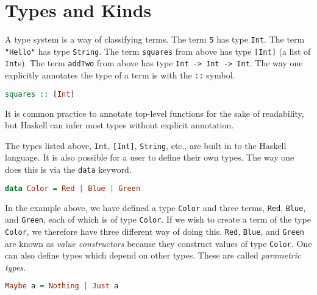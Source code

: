 \documentclass[MS, xcolor=dvipsnames]{wfuthesis}
\theoremstyle{definition}
\begin{document}
\section{Types and Kinds}
A type system is a way of classifying terms. The term \lstinline{5} has type \lstinline{Int}. The term \lstinline{"Hello"} has type \lstinline{String}. The term \lstinline{squares} from above has type \lstinline{[Int]} (a list of \lstinline{Int}s). The term \lstinline{addTwo} from above has type \lstinline{Int -> Int -> Int}. The way one explicitly annotates the type of a term is with the \lstinline{::} symbol.
\begin{lstlisting}[language=Haskell]
squares :: [Int]
\end{lstlisting}
It is common practice to annotate top-level functions for the sake of readability, but Haskell can infer most types without explicit annotation. \par 
The types listed above, \lstinline{Int}, \lstinline{[Int]}, \lstinline{String}, etc., are built in to the Haskell language. It is also possible for a user to define their own types. The way one does this is via the \lstinline{data} keyword.
\begin{lstlisting}[language=Haskell]
data Color = Red | Blue | Green
\end{lstlisting}
In the example above, we have defined a type \lstinline{Color} and three terms, \lstinline{Red}, \lstinline{Blue}, and \lstinline{Green}, each of which is of type \lstinline{Color}. If we wish to create a term of the type \lstinline{Color}, we therefore have three different way of doing this. \lstinline{Red}, \lstinline{Blue}, and \lstinline{Green} are known as \emph{value constructors} because they construct values of type \lstinline{Color}. One can also define types which depend on other types. These are called \emph{parametric types}. 
\begin{lstlisting}[language=Haskell]
Maybe a = Nothing | Just a
\end{lstlisting}
\end{document}
